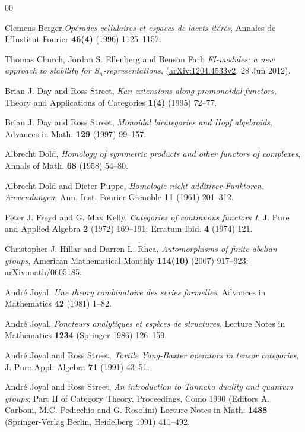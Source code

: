 \documentclass[a4paper,12pt,reqno]{amsart}
\theoremstyle{definition}
\theoremstyle{fact}
\theoremstyle{genquest}
\theoremstyle{step}
\begin{document}
\begin{thebibliography}{00}

 Clemens Berger,\textit{Op\'erades cellulaires et espaces de lacets it\'er\'es}, Annales de L'Institut Fourier \textbf{46(4)} (1996) 1125--1157.\label{Berger1996} 

 Thomas Church, Jordan S. Ellenberg and Benson Farb \textit{FI-modules: a new approach to stability for $S_n$-representations}, (\url{arXiv:1204.4533v2}, 28 Jun 2012).\label{CEF2012}

 Brian J. Day and Ross Street, \textit{Kan extensions along promonoidal functors}, Theory and Applications of Categories \textbf{1(4)} (1995) 72--77. \label{DaySt1995} 

 Brian J. Day and Ross Street, \textit{Monoidal bicategories and Hopf algebroids}, Advances in Math. \textbf{129} (1997) 99--157. \label{DaySt1997}

 Albrecht Dold, \textit{Homology of symmetric products and other functors of complexes}, Annals of Math. \textbf{68} (1958) 54--80.\label{Dold}
 
 Albrecht Dold and Dieter Puppe, \textit{Homologie nicht-additiver Funktoren. Anwendungen}, Ann. Inst. Fourier Grenoble \textbf{11} (1961) 201--312.\label{DoldPuppe}

 Peter J. Freyd and G. Max Kelly, \textit{Categories of continuous functors I}, J. Pure and Applied Algebra \textbf{2} (1972) 169--191; Erratum Ibid. \textbf{4} (1974) 121.\label{FreydKelly}

 Christopher J. Hillar and Darren L. Rhea, \textit{Automorphisms of finite abelian groups}, American Mathematical Monthly \textbf{114(10)} (2007) 917--923; \url{arXiv:math/0605185}.\label{HillarDarren2007}

 Andr\'e Joyal, \textit{Une theory combinatoire des series formelles}, Advances in Mathematics \textbf{42} (1981) 1--82.\label{Species}

 Andr\'e Joyal, \textit{Foncteurs analytiques et esp\`eces de structures}, Lecture Notes in Mathematics \textbf{1234} (Springer 1986) 126--159.\label{AnalFunct} 

 Andr\'e Joyal and Ross Street, \textit{Tortile Yang-Baxter operators in tensor categories}, J. Pure Appl. Algebra \textbf{71} (1991) 43--51.\label{TYBO}

 Andr\'e Joyal and Ross Street, \textit{An introduction to Tannaka duality and quantum groups}; Part II of Category Theory, Proceedings, Como 1990 (Editors A. Carboni, M.C. Pedicchio and G. Rosolini) Lecture Notes in Math. \textbf{1488} (Springer-Verlag Berlin, Heidelberg 1991) 411--492.\label{ITD&QG}


\end{thebibliography}
\end{document}
